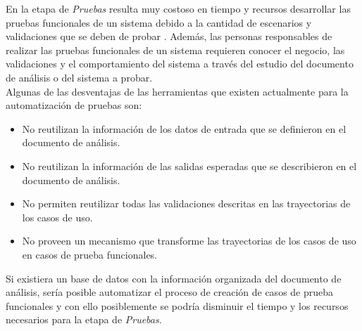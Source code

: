 

	En la etapa de {\it Pruebas} resulta muy costoso en tiempo y recursos desarrollar las pruebas funcionales de un sistema debido a la cantidad de escenarios y validaciones que se deben de probar \cite{pressman2005software}. Además, las personas responsables de realizar las pruebas funcionales de un sistema requieren conocer el negocio, las validaciones y el comportamiento del sistema a través del estudio del documento de análisis o del sistema a probar.\\
	
	Algunas de las desventajas de las herramientas que existen actualmente para la automatización de pruebas son:
	
\begin{itemize}
 \item No reutilizan la información de los datos de entrada que se definieron en el documento de análisis.
 \item No reutilizan la información de las salidas esperadas que se describieron en el documento de análisis.
 \item No permiten reutilizar todas las validaciones descritas en las trayectorias de los casos de uso.
 \item No proveen un mecanismo que transforme las trayectorias de los casos de uso en casos de prueba funcionales.
\end{itemize}

Si existiera un base de datos con la información organizada del documento de análisis, sería posible automatizar el proceso de creación de casos de prueba funcionales y con ello posiblemente se podría disminuir el tiempo y los recursos necesarios para la etapa de {\it Pruebas}.